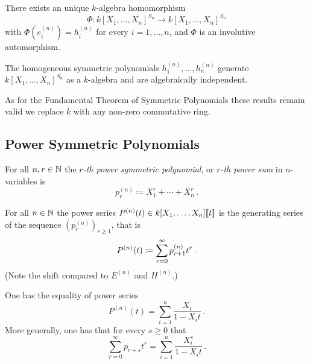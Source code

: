 \begin{corollary}
  There exists an unique $k$-algebra homomorphism
  \[
            \Phi
    \colon  k[X_1, \dotsc, X_n]^{S_n}
    \to     k[X_1, \dotsc, X_n]^{S_n}
  \]
  with $\Phi\left(e^{(n)}_i\right) = h^{(n)}_i$ for every $i = 1, \dotsc, n$, and $\Phi$ is an involutive automorphism.
\end{corollary}


\begin{corollary}
  The homogeneous symmetric polynomials $h^{(n)}_1, \dotsc, h^{(n)}_n$ generate $k[X_1, \dotsc, X_n]^{S_n}$ as a $k$-algebra and are algebraically independent.
\end{corollary}


\begin{remark}
  As for the Fundamental Theorem of Symmetric Polynomials these results remain valid we replace $k$ with any non-zero commutative ring.
\end{remark}





\subsection{Power Symmetric Polynomials}


\begin{definition}
  For all $n, r \in \mathbb{N}$ the \emph{$r$-th power symmetric polynomial}, or \emph{$r$-th power sum} in $n$-variables is
  \[
              p_r^{(n)}
    \coloneqq X_1^r + \dotsb + X_n^r \,.
  \]
\end{definition}


\begin{definition}
  For all $n \in \mathbb{N}$ the power series $P^{(n)}(t) \in k[X_1, \dotsc, X_n]\!\left[\!\left[t\right]\!\right]$ is the generating series of the sequence $(p^{(n)}_r)_{r \geq 1}$, that is
  \[
            P^{(n)}(t)
  \coloneqq  \sum_{r=0}^\infty p^{(n)}_{r+1} t^r \,.
  \]
  (Note the shift compared to $E^{(n)}$ and $H^{(n)}$.)
\end{definition}


\begin{lemma}
  \label{lemma: explicit formula for P}
  One has the equality of power series
  \[
      P^{(n)}(t)
    = \sum_{i=1}^n \frac{X_i}{1 - X_i t} \,.
  \]
  More generally, one has that for every $s \geq 0$ that
  \[
      \sum_{r=0}^\infty p_{r+s} t^r
    = \sum_{i=1}^n \frac{X_i^s}{1 - X_i t} \,.
  \]
\end{lemma}


